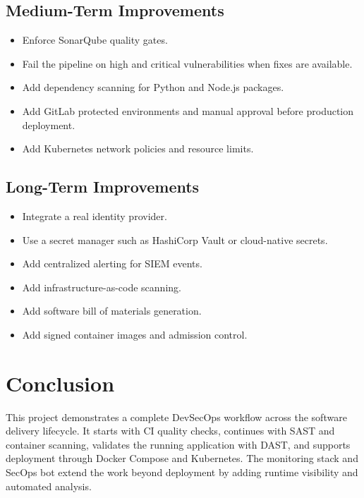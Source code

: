 \documentclass[12pt,a4paper]{report}
\begin{document}
\section{Medium-Term Improvements}

\begin{itemize}[leftmargin=*]
    \item Enforce SonarQube quality gates.
    \item Fail the pipeline on high and critical vulnerabilities when fixes are available.
    \item Add dependency scanning for Python and Node.js packages.
    \item Add GitLab protected environments and manual approval before production deployment.
    \item Add Kubernetes network policies and resource limits.
\end{itemize}

\section{Long-Term Improvements}

\begin{itemize}[leftmargin=*]
    \item Integrate a real identity provider.
    \item Use a secret manager such as HashiCorp Vault or cloud-native secrets.
    \item Add centralized alerting for SIEM events.
    \item Add infrastructure-as-code scanning.
    \item Add software bill of materials generation.
    \item Add signed container images and admission control.
\end{itemize}

\chapter{Conclusion}

This project demonstrates a complete DevSecOps workflow across the software delivery lifecycle. It starts with CI quality checks, continues with SAST and container scanning, validates the running application with DAST, and supports deployment through Docker Compose and Kubernetes. The monitoring stack and SecOps bot extend the work beyond deployment by adding runtime visibility and automated analysis.
\end{document}
